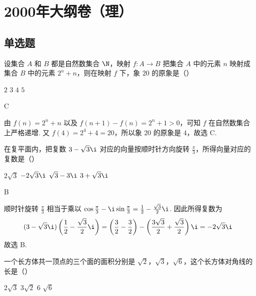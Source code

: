 \chapter{2000年大纲卷（理）}
\section{单选题}

\begin{problem}
设集合 \(A\) 和 \(B\) 都是自然数集合 \(\N\)，映射 \(f:A\to B\) 把集合 \(A\) 中的元素 \(n\) 映射成集合 \(B\) 中的元素 \(2^n+n\)，则在映射 \(f\) 下，象 \(20\) 的原象是（\quad）

\choices
    {\(2\)}
    {\(3\)}
    {\(4\)}
    {\(5\)}
\end{problem}

\begin{answer}
C
\end{answer}

\begin{solution}
由 \(f(n)=2^n+n\) 以及 \(f(n+1)-f(n)=2^n+1>0\)，可知 \(f\) 在自然数集合上严格递增. 又 \(f(4)=2^4+4=20\)，所以象 \(20\) 的原象是 \(4\)，故选 C.
\end{solution}

\begin{problem}
在复平面内，把复数 \(3-\sqrt{3}\i\) 对应的向量按顺时针方向旋转 \(\frac{\pi}{3}\)，所得向量对应的复数是（\quad）

\choices
    {\(2\sqrt{3}\)}
    {\(-2\sqrt{3}\i\)}
    {\(\sqrt{3}-3\i\)}
    {\(3+\sqrt{3}\i\)}
\end{problem}

\begin{answer}
B
\end{answer}

\begin{solution}
顺时针旋转 \(\frac{\pi}{3}\) 相当于乘以
\(\cos\frac{\pi}{3}-\i\sin\frac{\pi}{3}=\frac12-\frac{\sqrt{3}}2\i\). 因此所得复数为
\[
(3-\sqrt{3}\i)\left(\frac12-\frac{\sqrt{3}}2\i\right)
=\left(\frac32-\frac32\right)-\left(\frac{3\sqrt{3}}2+\frac{\sqrt{3}}2\right)\i
=-2\sqrt{3}\i
\]
故选 B.
\end{solution}

\begin{problem}
一个长方体共一顶点的三个面的面积分别是 \(\sqrt{2}\)，\(\sqrt{3}\)，\(\sqrt{6}\)，这个长方体对角线的长是（\quad）

\choices
    {\(2\sqrt{3}\)}
    {\(3\sqrt{2}\)}
    {\(6\)}
    {\(\sqrt{6}\)}
\end{problem}


